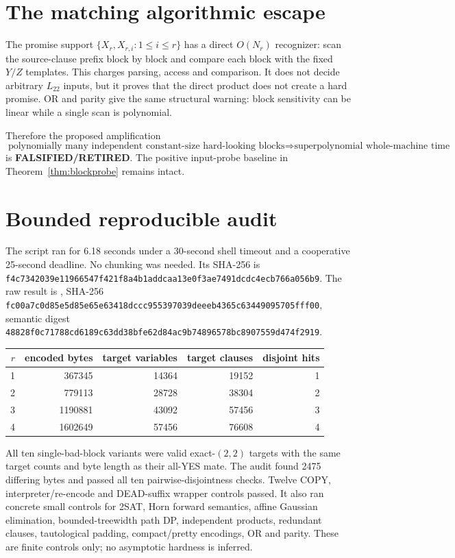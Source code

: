 \documentclass[11pt]{article}
\newcommand{\Ltwo}{L_{22}}
\newcommand{\RET}{\textbf{FALSIFIED/RETIRED}}
\begin{document}
\section{The matching algorithmic escape}
The promise support $\{X_r,X_{r,i}:1\le i\le r\}$ has a direct
$O(N_r)$ recognizer: scan the source-clause prefix block by block and compare
each block with the fixed $Y/Z$ templates.  This charges parsing, access and
comparison.  It does not decide arbitrary $\Ltwo$ inputs, but it proves that
the direct product does not create a hard promise.  OR and parity give the
same structural warning: block sensitivity can be linear while a single scan
is polynomial.

Therefore the proposed amplification
\[
 \text{polynomially many independent constant-size hard-looking blocks}
 \Longrightarrow \text{superpolynomial whole-machine time}
\]
is \RET.  The positive input-probe baseline in
Theorem~\ref{thm:blockprobe} remains intact.

\section{Bounded reproducible audit}
The script
ran for 6.18 seconds under a 30-second shell timeout and a cooperative
25-second deadline.  No chunking was needed.  Its SHA-256 is
\texttt{f4c7342039e11966547f421f8a4b1addcaa13e0f3ae7491dcdc4ecb766a056b9}.
The raw result is
,
SHA-256
\texttt{fc00a7c0d85e5d85e65e63418dccc955397039deeeb4365c63449095705fff00},
semantic digest
\texttt{48828f0c71788cd6189c63dd38bfe62d84ac9b74896578bc8907559d474f2919}.

\begin{center}
\begin{tabular}{rrrrr}
\toprule
$r$ & encoded bytes & target variables & target clauses & disjoint hits\\
\midrule
1 & 367345 & 14364 & 19152 & 1\\
2 & 779113 & 28728 & 38304 & 2\\
3 & 1190881 & 43092 & 57456 & 3\\
4 & 1602649 & 57456 & 76608 & 4\\
\bottomrule
\end{tabular}
\end{center}

All ten single-bad-block variants were valid exact-$(2,2)$ targets with the
same target counts and byte length as their all-YES mate.  The audit found
2475 differing bytes and passed all ten pairwise-disjointness checks.  Twelve
COPY, interpreter/re-encode and DEAD-suffix wrapper controls passed.  It also
ran concrete small controls for 2SAT, Horn forward semantics, affine Gaussian
elimination, bounded-treewidth path DP, independent products, redundant
clauses, tautological padding, compact/pretty encodings, OR and parity.  These
are finite controls only; no asymptotic hardness is inferred.
\end{document}
